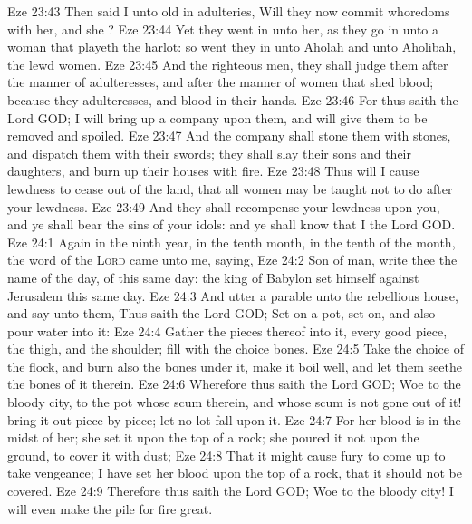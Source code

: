 \vs Eze 23:43 Then said I unto  old in adulteries, Will they now commit whoredoms with her, and she ?
\vs Eze 23:44 Yet they went in unto her, as they go in unto a woman that playeth the harlot: so went they in unto Aholah and unto Aholibah, the lewd women.
\vs Eze 23:45 And the righteous men, they shall judge them after the manner of adulteresses, and after the manner of women that shed blood; because they  adulteresses, and blood  in their hands.
\vs Eze 23:46 For thus saith the Lord GOD; I will bring up a company upon them, and will give them to be removed and spoiled.
\vs Eze 23:47 And the company shall stone them with stones, and dispatch them with their swords; they shall slay their sons and their daughters, and burn up their houses with fire.
\vs Eze 23:48 Thus will I cause lewdness to cease out of the land, that all women may be taught not to do after your lewdness.
\vs Eze 23:49 And they shall recompense your lewdness upon you, and ye shall bear the sins of your idols: and ye shall know that I  the Lord GOD.
\vs Eze 24:1 Again in the ninth year, in the tenth month, in the tenth  of the month, the word of the \textsc{Lord} came unto me, saying,
\vs Eze 24:2 Son of man, write thee the name of the day,  of this same day: the king of Babylon set himself against Jerusalem this same day.
\vs Eze 24:3 And utter a parable unto the rebellious house, and say unto them, Thus saith the Lord GOD; Set on a pot, set  on, and also pour water into it:
\vs Eze 24:4 Gather the pieces thereof into it,  every good piece, the thigh, and the shoulder; fill  with the choice bones.
\vs Eze 24:5 Take the choice of the flock, and burn also the bones under it,  make it boil well, and let them seethe the bones of it therein.
\vs Eze 24:6 Wherefore thus saith the Lord GOD; Woe to the bloody city, to the pot whose scum  therein, and whose scum is not gone out of it! bring it out piece by piece; let no lot fall upon it.
\vs Eze 24:7 For her blood is in the midst of her; she set it upon the top of a rock; she poured it not upon the ground, to cover it with dust;
\vs Eze 24:8 That it might cause fury to come up to take vengeance; I have set her blood upon the top of a rock, that it should not be covered.
\vs Eze 24:9 Therefore thus saith the Lord GOD; Woe to the bloody city! I will even make the pile for fire great.
